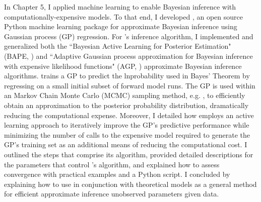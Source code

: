 In Chapter 5, I applied machine learning to enable Bayesian inference with computationally-expensive models. To that end, I developed \approxposterior, an open source Python machine learning package for approximate Bayesian inference using Gaussian process (GP) regression. For \approxposterior's inference algorithm, I implemented and generalized both the ``Bayesian Active Learning for Posterior Estimation" (BAPE, \citet{Kandasamy2017}) and ``Adaptive Gaussian process approximation for Bayesian inference with expensive likelihood functions" (AGP, \citet{Wang2018}) approximate Bayesian inference algorithms. \approxposterior trains a GP to predict the lnprobability used in Bayes' Theorem by regressing on a small initial subset of forward model runs. The GP is used within an Markov Chain Monte Carlo (MCMC) sampling method, e.g. \emcee, to efficiently obtain an approximation to the posterior probability distribution, dramatically reducing the computational expense. Moreover, I detailed how \approxposterior employs an active learning approach to iteratively improve the GP's predictive performance while minimizing the number of calls to the expensive model required to generate the GP's training set as an additional means of reducing the computational cost.  I outlined the steps that comprise its algorithm, provided detailed descriptions for the parameters that control \approxposterior's algorithm, and explained how to assess convergence with practical examples and a Python script. I concluded by explaining how to use \approxposterior in conjunction with theoretical models as a general method for efficient approximate inference unobserved parameters given data.
 
